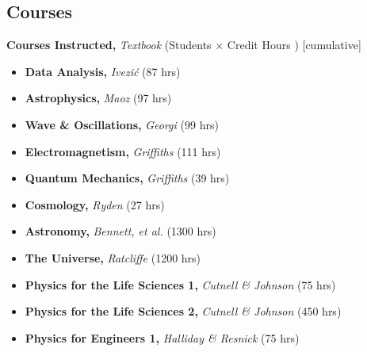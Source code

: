 \documentclass[11pt,letterpaper,sans,unicode]{moderncv}
\begin{document}
\subsection{Courses}
	\hspace{8mm}\textbf{\color{color1} Courses Instructed,} \emph{Textbook}  (Students $\times$ Credit Hours $\!$) {\footnotesize [cumulative]}

	\vspace*{1mm}

	\begin{itemize}[leftmargin=8mm]
        		\item \textbf{\color{color1} Data Analysis,} \emph{Ivezi\'c} (87 hrs)
		\item \textbf{\color{color1} Astrophysics,} \emph{Maoz} (97 hrs)
		\item \textbf{\color{color1} Wave \& Oscillations,} \emph{Georgi} (99 hrs)
		\item \textbf{\color{color1} Electromagnetism,} \emph{Griffiths} (111 hrs)
		\item \textbf{\color{color1} Quantum Mechanics,} \emph{Griffiths} (39 hrs)
		\item \textbf{\color{color1} Cosmology,} \emph{Ryden} (27 hrs)
		\item \textbf{\color{color1} Astronomy,} \emph{Bennett, et al.} (1300 hrs)
		\item \textbf{\color{color1} The Universe,} \emph{Ratcliffe} (1200 hrs)
		\item \textbf{\color{color1} Physics for the Life Sciences 1,} \emph{Cutnell \& Johnson} (75 hrs)
		\item \textbf{\color{color1} Physics for the Life Sciences 2,} \emph{Cutnell \& Johnson} (450 hrs)
		\item \textbf{\color{color1} Physics for Engineers 1,} \emph{Halliday \& Resnick} (75 hrs)
        \end{itemize}



\end{document}
